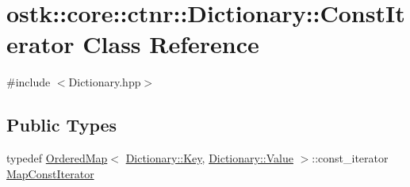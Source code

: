\hypertarget{classostk_1_1core_1_1ctnr_1_1_dictionary_1_1_const_iterator}{}\section{ostk\+:\+:core\+:\+:ctnr\+:\+:Dictionary\+:\+:Const\+Iterator Class Reference}
\label{classostk_1_1core_1_1ctnr_1_1_dictionary_1_1_const_iterator}


{\ttfamily \#include $<$Dictionary.\+hpp$>$}

\subsection*{Public Types}
\begin{DoxyCompactItemize}
\item 
typedef \hyperlink{namespaceostk_1_1core_1_1ctnr_a13ac23065e75eb425f38bfca4d0c6b38}{Ordered\+Map}$<$ \hyperlink{classostk_1_1core_1_1ctnr_1_1_dictionary_aa3b171525039535f342d271d27f90407}{Dictionary\+::\+Key}, \hyperlink{classostk_1_1core_1_1ctnr_1_1_dictionary_ace6ab82268031e972455affca8730c9c}{Dictionary\+::\+Value} $>$\+::const\+\_\+iterator \hyperlink{classostk_1_1core_1_1ctnr_1_1_dictionary_1_1_const_iterator_a7c7a0e5a0a15da39cbb2115306fdef4c}{Map\+Const\+Iterator}
\end{DoxyCompactItemize}
